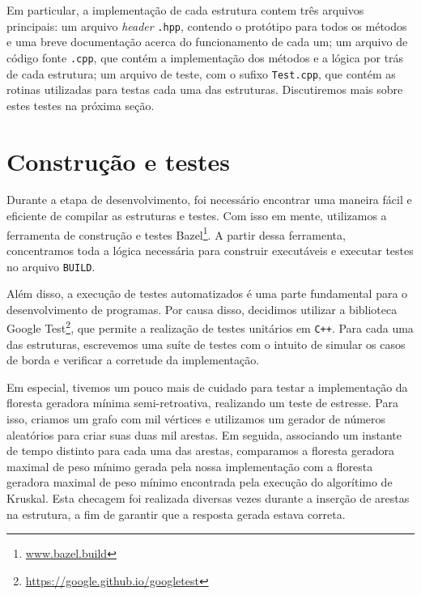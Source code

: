 Em particular, a implementação de cada estrutura contem três arquivos principais: um arquivo \emph{header} \texttt{.hpp}, contendo o protótipo para todos os métodos e uma breve documentação acerca do funcionamento de cada um; um arquivo de código fonte \texttt{.cpp}, que contém a implementação dos métodos e a lógica por trás de cada estrutura; um arquivo de teste, com o sufixo \texttt{Test.cpp}, que contém as rotinas utilizadas para testas cada uma das estruturas. Discutiremos mais sobre estes testes na próxima seção.

\section{Construção e testes}

Durante a etapa de desenvolvimento, foi necessário encontrar uma maneira fácil e eficiente de compilar as estruturas e testes. Com isso em mente, utilizamos a ferramenta de construção e testes Bazel\footnote{\url{www.bazel.build}}. A partir dessa ferramenta, concentramos toda a lógica necessária para construir executáveis e executar testes no arquivo \texttt{BUILD}.

Além disso, a execução de testes automatizados é uma parte fundamental para o desenvolvimento de programas. Por causa disso, decidimos utilizar a biblioteca Google Test\footnote{\url{https://google.github.io/googletest}}, que permite a realização de testes unitários em \texttt{C++}. Para cada uma das estruturas, escrevemos uma suíte de testes com o intuito de simular os casos de borda e verificar a corretude da implementação.

Em especial, tivemos um pouco mais de cuidado para testar a implementação da floresta geradora mínima semi-retroativa, realizando um teste de estresse. Para isso, criamos um grafo com mil vértices e utilizamos um gerador de números aleatórios para criar suas duas mil arestas. Em seguida, associando um instante de tempo distinto para cada uma das arestas, comparamos a floresta geradora maximal de peso mínimo gerada pela nossa implementação com a floresta geradora maximal de peso mínimo encontrada pela execução do algorítimo de Kruskal. Esta checagem foi realizada diversas vezes durante a inserção de arestas na estrutura, a fim de garantir que a resposta gerada estava correta.

